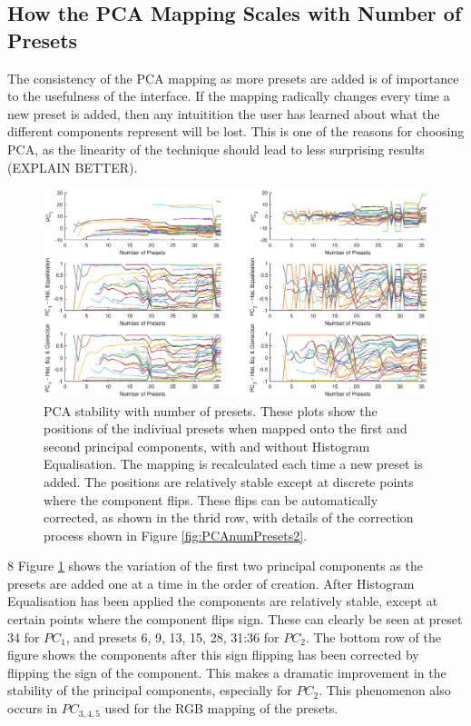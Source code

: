 \documentclass[11pt, oneside]{report}   	%
\begin{document}
\subsection{How the PCA Mapping Scales with Number of Presets}
The consistency of the PCA mapping as more presets are added is of importance to the usefulness of the interface. If the mapping radically changes every time a new preset is added, then any intuitition the user has learned about what the different components represent will be lost. This is one of the reasons for choosing PCA, as the linearity of the technique should lead to less surprising results (EXPLAIN BETTER).\\
\begin{figure}[h]
	\hspace{-80pt}
	\includegraphics[width = 8.5in]{PCAnumPresets1.eps}
	\caption{PCA stability with number of presets. These plots show the positions of the indiviual presets when mapped onto the first and second principal components, with and without Histogram Equalisation. The mapping is recalculated each time a new preset is added. The positions are relatively stable except at discrete points where the component flips. These flips can be automatically corrected, as shown in the thrid row, with details of the correction process shown in Figure \ref{fig:PCAnumPresets2}.}
	\label{fig:PCAnumPresets}
\end{figure}8
Figure \ref{fig:PCAnumPresets} shows the variation of the first two principal components as the presets are added one at a time in the order of creation. After Histogram Equalisation has been applied the components are relatively stable, except at certain points where the component flips sign. These can clearly be seen at preset 34 for $PC_1$, and presets 6, 9, 13, 15, 28, 31:36 for $PC_2$. The bottom row of the figure shows the components after this sign flipping has been corrected by flipping the sign of the component. This makes a dramatic improvement in the stability of the principal components, especially for $PC_2$. This phenomenon also occurs in $PC_{3,4,5}$ used for the RGB mapping of the presets.
\end{document}
